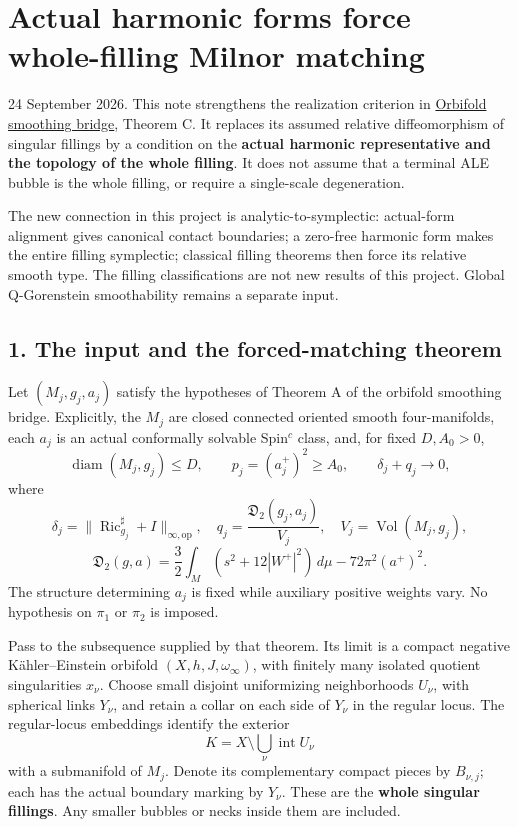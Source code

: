 \documentclass[
  11pt,
]{article}
\author{}
\date{}
\begin{document}
\hypertarget{actual-harmonic-forms-force-whole-filling-milnor-matching}{%
\section{Actual harmonic forms force whole-filling Milnor
matching}\label{actual-harmonic-forms-force-whole-filling-milnor-matching}}

24 September 2026. This note strengthens the realization criterion in
\href{20260924_orbifold_smoothing_bridge.md}{Orbifold smoothing bridge},
Theorem C. It replaces its assumed relative diffeomorphism of singular
fillings by a condition on the \textbf{actual harmonic representative
and the topology of the whole filling}. It does not assume that a
terminal ALE bubble is the whole filling, or require a single-scale
degeneration.

The new connection in this project is analytic-to-symplectic:
actual-form alignment gives canonical contact boundaries; a zero-free
harmonic form makes the entire filling symplectic; classical filling
theorems then force its relative smooth type. The filling
classifications are not new results of this project. Global Q-Gorenstein
smoothability remains a separate input.

\hypertarget{the-input-and-the-forced-matching-theorem}{%
\subsection{1. The input and the forced-matching
theorem}\label{the-input-and-the-forced-matching-theorem}}

Let \((M_j,g_j,a_j)\) satisfy the hypotheses of Theorem A of the
orbifold smoothing bridge. Explicitly, the \(M_j\) are closed connected
oriented smooth four-manifolds, each \(a_j\) is an actual conformally
solvable Spin\(^c\) class, and, for fixed \(D,A_0>0\), \[
 \operatorname{diam}(M_j,g_j)\le D,\qquad
 p_j=(a_j^+)^2\ge A_0,\qquad
 \delta_j+q_j\longrightarrow0,                         \tag{1}
\] where \[
 \delta_j=\|\operatorname{Ric}_{g_j}^{\sharp}+I\|_{\infty,\mathrm{op}},
 \quad q_j=\frac{\mathfrak D_2(g_j,a_j)}{V_j},
 \quad V_j=\operatorname{Vol}(M_j,g_j),
\] \[
 \mathfrak D_2(g,a)
 =\frac32\int_M(s^2+12|W^+|^2)\,d\mu-72\pi^2(a^+)^2.
\] The structure determining \(a_j\) is fixed while auxiliary positive
weights vary. No hypothesis on \(\pi_1\) or \(\pi_2\) is imposed.

Pass to the subsequence supplied by that theorem. Its limit is a compact
negative Kähler--Einstein orbifold \((X,h,J,\omega_\infty)\), with
finitely many isolated quotient singularities \(x_\nu\). Choose small
disjoint uniformizing neighborhoods \(U_\nu\), with spherical links
\(Y_\nu\), and retain a collar on each side of \(Y_\nu\) in the regular
locus. The regular-locus embeddings identify the exterior \[
                  K=X\setminus\bigcup_\nu\operatorname{int}U_\nu
\] with a submanifold of \(M_j\). Denote its complementary compact
pieces by \(B_{\nu,j}\); each has the actual boundary marking by
\(Y_\nu\). These are the \textbf{whole singular fillings}. Any smaller
bubbles or necks inside them are included.
\end{document}
